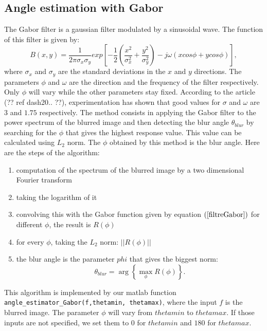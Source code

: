\subsection{Angle estimation with Gabor}
\label{subsec:Gabor}
The Gabor filter is a gaussian filter modulated by a sinusoidal wave. The function of this filter is given by:
\begin{equation}
B(x,y)=\dfrac{1}{2\pi \sigma_x \sigma_y} exp\left[-\frac{1}{2}\left(\frac{x^2}{\sigma_x^2}+ \frac{y^2}{\sigma_y^2} \right) -j\omega(xcos\phi + ycos\phi)\right],
\label{filtreGabor}
\end{equation}
where $\sigma_x$ and $\sigma_y$ are the standard deviations in the $x$ and $y$ directions. The parameters $\phi$ and $\omega$ are the direction and the frequency of the filter respectively. Only $\phi$ will vary while the other parameters stay fixed. According to the article (?? ref dash20.. ??), experimentation has shown that good values for $\sigma$ and $\omega$ are $3$ and $1.75$ respectively. The method consists in applying the Gabor filter to the power spectrum of the blurred image and then detecting the blur angle $\theta_{blur}$ by searching for the $\phi$ that gives the highest response value. This value can be calculated using $L_2$ norm. The $\phi$ obtained by this method is the blur angle. Here are the steps of the algorithm:
\begin{enumerate}
\item computation of the spectrum of the blurred image by a two dimensional Fourier transform
\item taking the logarithm of it
\item convolving this with the Gabor function given by equation $(\ref{filtreGabor})$ for different $\phi$, the result is $R(\phi)$
\item for every $\phi$, taking the $L_2$ norm: $||R(\phi)||$
\item the blur angle is the parameter $phi$ that gives the biggest norm:
\begin{equation}
\theta_{blur} = \arg \left\lbrace \max_{\phi}R(\phi)\right\rbrace.
\end{equation}
\end{enumerate}

This algorithm is implemented by our matlab function \texttt{angle\_estimator\_Gabor(f,thetamin, thetamax)}, where the input $f$ is the blurred image. The parameter $\phi$ will vary from $thetamin$ to $thetamax$. If those inputs are not specified, we set them to $0$ for $thetamin$ and $180$ for $thetamax$.

